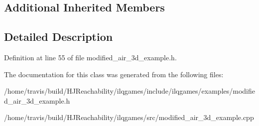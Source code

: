 \subsection*{Additional Inherited Members}


\subsection{Detailed Description}


Definition at line 55 of file modified\+\_\+air\+\_\+3d\+\_\+example.\+h.



The documentation for this class was generated from the following files\+:\begin{DoxyCompactItemize}
\item 
/home/travis/build/\+H\+J\+Reachability/ilqgames/include/ilqgames/examples/modified\+\_\+air\+\_\+3d\+\_\+example.\+h\item 
/home/travis/build/\+H\+J\+Reachability/ilqgames/src/modified\+\_\+air\+\_\+3d\+\_\+example.\+cpp\end{DoxyCompactItemize}
